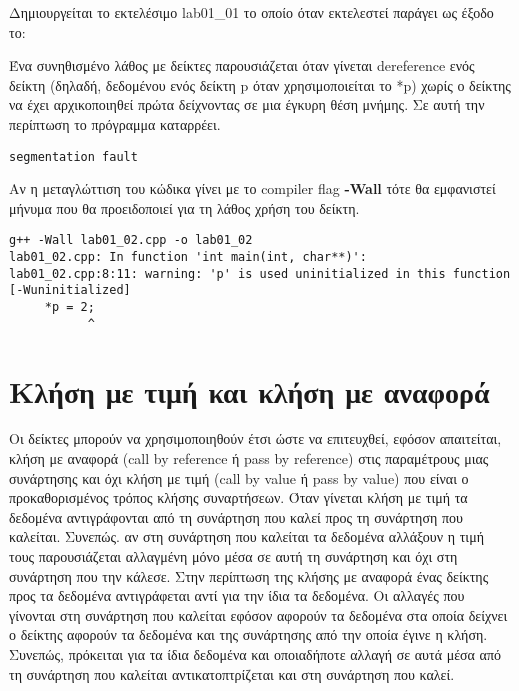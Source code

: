 Δημιουργείται το εκτελέσιμο lab01\_01 το οποίο όταν εκτελεστεί παράγει ως έξοδο το: 


Ένα συνηθισμένο λάθος με δείκτες παρουσιάζεται όταν γίνεται dereference ενός δείκτη (δηλαδή, δεδομένου ενός δείκτη p όταν χρησιμοποιείται το *p) χωρίς ο δείκτης να έχει αρχικοποιηθεί πρώτα δείχνοντας σε μια έγκυρη θέση μνήμης. Σε αυτή την περίπτωση το πρόγραμμα καταρρέει. 



\begin{lstlisting}[style=DOS]
segmentation fault
\end{lstlisting}

Αν η μεταγλώττιση του κώδικα γίνει με το compiler flag \textbf{-Wall} τότε θα εμφανιστεί μήνυμα που θα προειδοποιεί για τη λάθος χρήση του δείκτη.

\begin{lstlisting}[style=DOS]
g++ -Wall lab01_02.cpp -o lab01_02
lab01_02.cpp: In function 'int main(int, char**)':
lab01_02.cpp:8:11: warning: 'p' is used uninitialized in this function [-Wuninitialized]
     *p = 2;
           ^
\end{lstlisting}

\section{Κλήση με τιμή και κλήση με αναφορά}
Οι δείκτες μπορούν να χρησιμοποιηθούν έτσι ώστε να επιτευχθεί, εφόσον απαιτείται, κλήση με αναφορά (call by reference ή pass by reference) στις παραμέτρους μιας συνάρτησης και όχι κλήση με τιμή (call by value ή pass by value) που είναι ο προκαθορισμένος τρόπος κλήσης συναρτήσεων. Όταν γίνεται κλήση με τιμή τα δεδομένα αντιγράφονται από τη συνάρτηση που καλεί προς τη συνάρτηση που καλείται. Συνεπώς. αν στη συνάρτηση που καλείται τα δεδομένα αλλάξουν η τιμή τους παρουσιάζεται αλλαγμένη μόνο μέσα σε αυτή τη συνάρτηση και όχι στη συνάρτηση που την κάλεσε. Στην περίπτωση της κλήσης με αναφορά ένας δείκτης προς τα δεδομένα αντιγράφεται αντί για την ίδια τα δεδομένα. Οι αλλαγές που γίνονται στη συνάρτηση που καλείται εφόσον αφορούν τα δεδομένα στα οποία δείχνει ο δείκτης αφορούν τα δεδομένα και της συνάρτησης από την οποία έγινε η κλήση. Συνεπώς, πρόκειται για τα ίδια δεδομένα και οποιαδήποτε αλλαγή σε αυτά μέσα από τη συνάρτηση που καλείται αντικατοπτρίζεται και στη συνάρτηση που καλεί.

